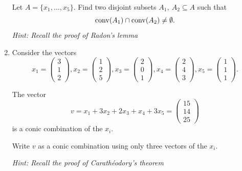 \begin{enumerate}[1)]
Let $A=\{x_1, \ldots, x_5\}$.
Find two disjoint subsets $A_1,~A_2\subseteq A$ such that 
$$ \operatorname{conv}(A_1)\cap\operatorname{conv}(A_2)\neq \emptyset.$$ 
\emph{Hint: Recall the proof of Radon's lemma}
\item Consider the vectors
$$ x_1 = \left(\begin{array}{c} 3 \\ 1 \\ 2\end{array}\right), x_2 = \left(\begin{array}{c} 1 \\ 2 \\ 5 \end{array}\right), x_3 = \left(\begin{array}{c} 2 \\ 0 \\ 1 \end{array}\right), x_4 = \left(\begin{array}{c}  2 \\ 4 \\ 3 \end{array}\right), x_5 = \left(\begin{array}{c}  1 \\ 1 \\ 1 \end{array}\right). $$

The vector 
$$ v= x_1 + 3 x_2 + 2 x_3 + x_4 + 3 x_5 =  \left(\begin{array}{c}  15\\ 14 \\ 25 \end{array}\right)$$
is a conic combination of the $x_i$.

Write $v$ as a conic combination using only three vectors of the $x_i$.

\emph{Hint: Recall the proof of Carath\'eodory's theorem}


\end{enumerate}
